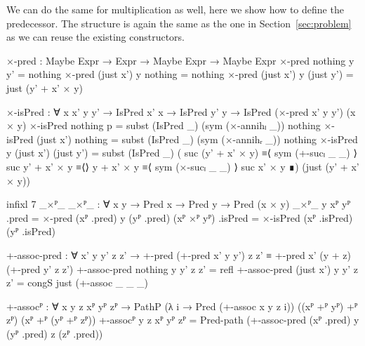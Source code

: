 We can do the same for multiplication as well, here we show how to define the
predecessor. The structure is again the same as the one in
Section~\ref{sec:problem} as we can reuse the existing constructors.
\begin{code}
  ×-pred :
    Maybe Expr → Expr → Maybe Expr → Maybe Expr
  ×-pred nothing    y y'         = nothing
  ×-pred (just x')  y nothing    = nothing
  ×-pred (just x')  y (just y')  = just (y' + x' × y)
\end{code}
\begin{code}[hide]
  ×-isPred :
    ∀ {x x' y y'} →
    IsPred x' x → IsPred y' y → IsPred (×-pred x' y y') (x × y)
  ×-isPred nothing p = subst (IsPred _) (sym (×-annihₗ _)) nothing
  ×-isPred (just x') nothing = subst (IsPred _) (sym (×-annihᵣ _)) nothing
  ×-isPred {y} (just x') (just y') =
    subst (IsPred _)
      ( suc (y' + x' × y)  ≡⟨ sym (+-sucₗ _ _) ⟩
        suc y' + x' × y    ≡⟨⟩
        y + x' × y         ≡⟨ sym (×-sucₗ _ _) ⟩
        suc x' × y         ∎)
      (just (y' + x' × y))

  infixl 7 _×ᴾ_
  _×ᴾ_ : ∀ {x y} → Pred x → Pred y → Pred (x × y)
  _×ᴾ_ {y} xᴾ yᴾ .pred = ×-pred (xᴾ .pred) y (yᴾ .pred)
  (xᴾ ×ᴾ yᴾ) .isPred = ×-isPred (xᴾ .isPred) (yᴾ .isPred)

  +-assoc-pred :
    ∀ x' y y' z z' →
    +-pred (+-pred x' y y') z z' ≡ +-pred x' (y + z) (+-pred y' z z')
  +-assoc-pred nothing y y' z z' = refl
  +-assoc-pred (just x') y y' z z' = congS just (+-assoc _ _ _)

  +-assocᴾ :
    ∀ {x y z} xᴾ yᴾ zᴾ →
    PathP (λ i → Pred (+-assoc x y z i)) ((xᴾ +ᴾ yᴾ) +ᴾ zᴾ) (xᴾ +ᴾ (yᴾ +ᴾ zᴾ))
  +-assocᴾ {y} {z} xᴾ yᴾ zᴾ =
    Pred-path (+-assoc-pred (xᴾ .pred) y (yᴾ .pred) z (zᴾ .pred))
\end{code}


